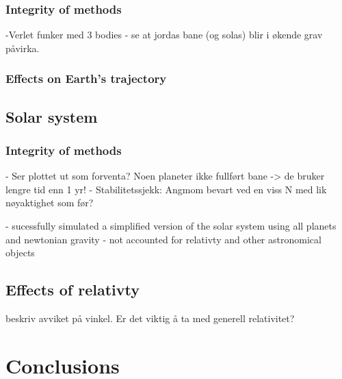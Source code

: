 \documentclass[%
oneside,                 %
final,                   %
10pt]{article}
\begin{document}
\subsubsection{Integrity of methods}
-Verlet funker med 3 bodies
- se at jordas bane (og solas) blir i økende grav påvirka.
\subsubsection{Effects on Earth's trajectory}

\subsection{Solar system}
\subsubsection{Integrity of methods}
- Ser plottet ut som forventa? Noen planeter ikke fullført bane -> de bruker lengre tid enn 1 yr!
- Stabilitetssjekk: Angmom bevart ved en viss N med lik nøyaktighet som før?

- sucessfully simulated a simplified version of the solar system using all planets and newtonian gravity - not accounted for relativty and other astronomical objects 
\subsection{Effects of relativty}
beskriv avviket på vinkel. Er det viktig å ta med generell relativitet?
\section{Conclusions}



\end{document}
